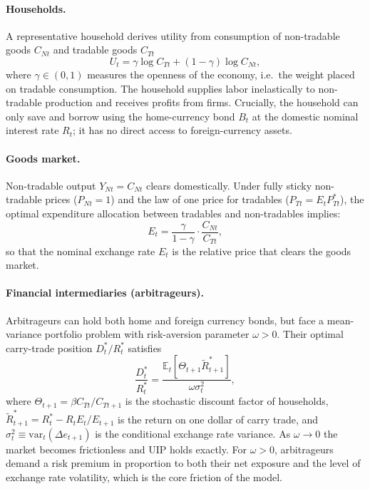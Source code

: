 \documentclass[12pt,a4paper]{article}
\begin{document}
\paragraph{Households.} A representative household derives utility from consumption of non-tradable goods $C_{Nt}$ and tradable goods $C_{Tt}$
\begin{equation}
    U_t = \gamma \log C_{Tt} + (1-\gamma) \log C_{Nt},
    \label{eq:utility}
\end{equation}
where $\gamma \in (0,1)$ measures the openness of the economy, i.e.\ the weight placed on tradable consumption. The household supplies labor inelastically to non-tradable production and receives profits from firms. Crucially, the household can only save and borrow using the home-currency bond $B_t$ at the domestic nominal interest rate $R_t$; it has no direct access to foreign-currency assets.

\paragraph{Goods market.} Non-tradable output $Y_{Nt} = C_{Nt}$ clears domestically. Under fully sticky non-tradable prices ($P_{Nt} = 1$) and the law of one price for tradables ($P_{Tt} = E_t P^*_{Tt}$), the optimal expenditure allocation between tradables and non-tradables implies:
\begin{equation}
    E_t = \frac{\gamma}{1-\gamma} \cdot \frac{C_{Nt}}{C_{Tt}},
    \label{eq:expenditure}
\end{equation}
so that the nominal exchange rate $E_t$ is the relative price that clears the goods market.

\paragraph{Financial intermediaries (arbitrageurs).} Arbitrageurs can hold both home and foreign currency bonds, but face a mean-variance portfolio problem with risk-aversion parameter $\omega > 0$. Their optimal carry-trade position $D^*_t/R^*_t$ satisfies
\begin{equation}
    \frac{D^*_t}{R^*_t} = \frac{\mathbb{E}_t[\Theta_{t+1}\tilde{R}^*_{t+1}]}{\omega \sigma^2_t},
    \label{eq:arbitrageur}
\end{equation}
where $\Theta_{t+1} = \beta C_{Tt}/C_{Tt+1}$ is the stochastic discount factor of households, $\tilde{R}^*_{t+1} = R^*_t - R_t E_t/E_{t+1}$ is the return on one dollar of carry trade, and $\sigma^2_t \equiv \text{var}_t(\Delta e_{t+1})$ is the conditional exchange rate variance. As $\omega \to 0$ the market becomes frictionless and UIP holds exactly. For $\omega > 0$, arbitrageurs demand a risk premium in proportion to both their net exposure and the level of exchange rate volatility, which is the core friction of the model.
\end{document}
